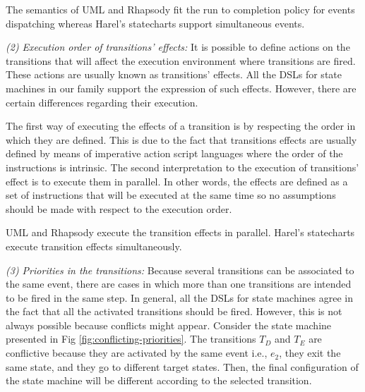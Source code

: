 The semantics of UML and Rhapsody fit the run to completion policy for events dispatching whereas Harel's statecharts support simultaneous events.

\vspace{2mm}
\textit{(2) Execution order of transitions' effects:} It is possible to define actions on the transitions that will affect the execution environment where transitions are fired. These actions are usually known as transitions' effects. All the DSLs for state machines in our family support the expression of such effects. However, there are certain differences regarding their execution.

The first way of executing the effects of a transition is by respecting the order in which they are defined. This is due to the fact that transitions effects are usually defined by means of imperative action script languages where the order of the instructions is intrinsic. The second interpretation to the execution of transitions' effect is to execute them in parallel. In other words, the effects are defined as a set of instructions that will be executed at the same time so no assumptions should be made with respect to the execution order.

UML and Rhapsody execute the transition effects in parallel. Harel's statecharts execute transition effects simultaneously.

\vspace{2mm}
\textit{(3) Priorities in the transitions:} Because several transitions can be associated to the same event, there are cases in which more than one transitions are intended to be fired in the same step. In general, all the DSLs for state machines agree in the fact that all the activated transitions should be fired. However, this is not always possible because conflicts might appear. Consider the state machine presented in Fig \ref{fig:conflicting-priorities}. The transitions $T_D$ and $T_E$ are conflictive because they are activated by the same event i.e., $e_2$, they exit the same state, and they go to different target states. Then, the final configuration of the state machine will be different according to the selected transition.

